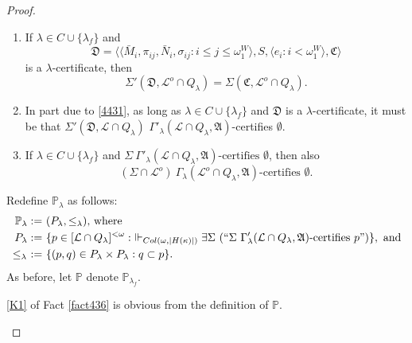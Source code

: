 \documentclass[12pt]{article}
\numberwithin{equation}{section}
\begin{document}
\begin{proof}
\begin{rem}\label{rem443}
\leavevmode
\begin{enumerate}[label=(\arabic*)]
    \item\label{443'1} If $\lambda \in C \cup \{\lambda_f\}$ and
    \begin{equation*}
        \mathfrak{D} = \langle \langle \bar{M}_i, \pi_{ij},  \bar{N}_i, \sigma_{ij} : i \leq j \leq \omega_1^{W} \rangle, S, \langle e_i : i < \omega_1^W \rangle, \mathfrak{C} \rangle
    \end{equation*}
    is a $\lambda$-certificate, then
    \begin{equation*}
        \Sigma'(\mathfrak{D}, \mathcal{L}^o \cap Q_{\lambda}) = \Sigma(\mathfrak{C}, \mathcal{L}^o \cap Q_{\lambda}) \text{.}
    \end{equation*}
    \item\label{443'2} In part due to \ref{4431}, as long as $\lambda \in C \cup \{\lambda_f\}$ and $\mathfrak{D}$ is a $\lambda$-certificate, it must be that $\Sigma'(\mathfrak{D}, \mathcal{L} \cap Q_{\lambda})$ $\Gamma'_{\lambda} (\mathcal{L} \cap Q_{\lambda}, \mathfrak{A})$-certifies $\emptyset$.
    \item\label{443'3} If $\lambda \in C \cup \{\lambda_f\}$ and $\Sigma \ \Gamma'_{\lambda} (\mathcal{L} \cap Q_{\lambda}, \mathfrak{A}) \text{-certifies } \emptyset$, then also
    \begin{equation*}
        (\Sigma \cap \mathcal{L}^o) \ \Gamma_{\lambda} (\mathcal{L}^o \cap Q_{\lambda}, \mathfrak{A}) \text{-certifies } \emptyset \text{.}
    \end{equation*}
\end{enumerate}
\end{rem}

Redefine $\mathbb{P}_{\lambda}$ as follows:
\begin{align*}
    \mathbb{P}_{\lambda} := \ & (P_{\lambda}, \leq_{\lambda}) \text{, where } \\
    P_{\lambda} := \ & \{p \in [\mathcal{L} \cap Q_{\lambda}]^{< \omega} : \ \Vdash_{Col(\omega, |H(\kappa)|)} \exists \Sigma \ (``\Sigma \ \Gamma'_{\lambda} (\mathcal{L} \cap Q_{\lambda}, \mathfrak{A}) \text{-certifies } p")\}, \text{ and} \\
    \leq_{\lambda} \ := \ & \{(p, q) \in P_{\lambda} \times P_{\lambda} : q \subset p\}.
\end{align*}
As before, let $\mathbb{P}$ denote $\mathbb{P}_{\lambda_f}$. 

\begin{rem}\label{rem447}
\ref{K1} of Fact \ref{fact436} is obvious from the definition of $\mathbb{P}$.
\end{rem}


\end{proof}
\end{document}
